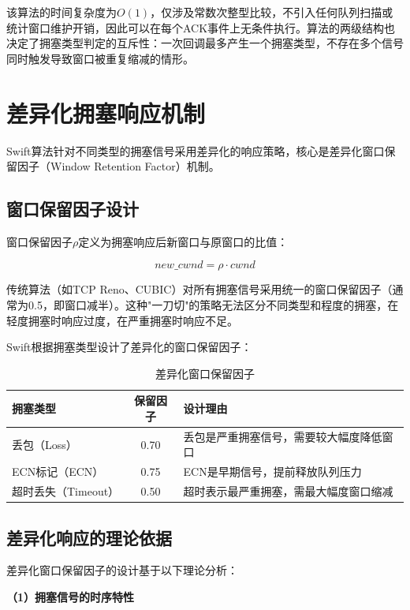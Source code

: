 该算法的时间复杂度为$O(1)$，仅涉及常数次整型比较，不引入任何队列扫描或统计窗口维护开销，因此可以在每个ACK事件上无条件执行。算法的两级结构也决定了拥塞类型判定的互斥性：一次回调最多产生一个拥塞类型，不存在多个信号同时触发导致窗口被重复缩减的情形。

\section{差异化拥塞响应机制}

Swift算法针对不同类型的拥塞信号采用差异化的响应策略，核心是差异化窗口保留因子（Window Retention Factor）机制。

\subsection{窗口保留因子设计}

窗口保留因子$\rho$定义为拥塞响应后新窗口与原窗口的比值：

\begin{equation}
new\_cwnd = \rho \cdot cwnd
\end{equation}

传统算法（如TCP Reno、CUBIC）对所有拥塞信号采用统一的窗口保留因子（通常为0.5，即窗口减半）。这种"一刀切"的策略无法区分不同类型和程度的拥塞，在轻度拥塞时响应过度，在严重拥塞时响应不足。

Swift根据拥塞类型设计了差异化的窗口保留因子：

\begin{table}[htbp]
\centering
\caption{差异化窗口保留因子}
\label{tab:retention}
\begin{tabular}{|l|c|l|}
\hline
\textbf{拥塞类型} & \textbf{保留因子} & \textbf{设计理由} \\
\hline
丢包（Loss） & 0.70 & 丢包是严重拥塞信号，需要较大幅度降低窗口 \\
ECN标记（ECN） & 0.75 & ECN是早期信号，提前释放队列压力 \\超时丢失（Timeout） & 0.50 & 超时表示最严重拥塞，需最大幅度窗口缩减 \\
\hline
\end{tabular}
\end{table}

\subsection{差异化响应的理论依据}

差异化窗口保留因子的设计基于以下理论分析：

\textbf{（1）拥塞信号的时序特性}

